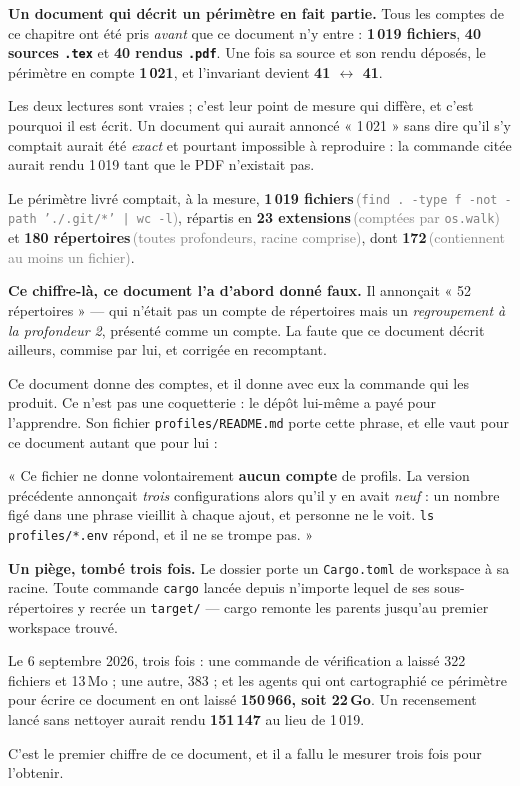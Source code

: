 \documentclass[10pt]{report}
\newcommand{\code}[1]{\texttt{\small #1}}
\newcommand{\att}[1]{\textcolor{amber}{\textbf{#1}}}
\newcommand{\mesure}[2]{\textbf{#1}\,\footnotesize\textcolor{grey}{(#2)}\normalsize}
\begin{document}
\begin{alerte}
\textbf{Un document qui décrit un périmètre en fait partie.} Tous les comptes de ce chapitre ont été
pris \emph{avant} que ce document n'y entre : \textbf{1\,019 fichiers}, \textbf{40 sources
\code{.tex}} et \textbf{40 rendus \code{.pdf}}. Une fois sa source et son rendu déposés, le périmètre
en compte \textbf{1\,021}, et l'invariant devient \textbf{41 $\leftrightarrow$ 41}.

Les deux lectures sont vraies ; c'est leur point de mesure qui diffère, et c'est pourquoi il est
écrit. Un document qui aurait annoncé « 1\,021 » sans dire qu'il s'y comptait aurait été
\emph{exact} et pourtant impossible à reproduire : la commande citée aurait rendu 1\,019 tant que le
PDF n'existait pas.
\end{alerte}

Le périmètre livré comptait, à la mesure, \mesure{1\,019 fichiers}{\code{find . -type f -not -path './.git/*' | wc -l}},
répartis en \mesure{23 extensions}{comptées par \code{os.walk}} et
\mesure{180 répertoires}{toutes profondeurs, racine comprise}, dont
\mesure{172}{contiennent au moins un fichier}.

\att{Ce chiffre-là, ce document l'a d'abord donné faux.} Il annonçait « 52 répertoires » --- qui
n'était pas un compte de répertoires mais un \emph{regroupement à la profondeur 2}, présenté comme
un compte. La faute que ce document décrit ailleurs, commise par lui, et corrigée en recomptant.

Ce document donne des comptes, et il donne avec eux la commande qui les produit. Ce n'est pas une
coquetterie : le dépôt lui-même a payé pour l'apprendre. Son fichier \code{profiles/README.md} porte
cette phrase, et elle vaut pour ce document autant que pour lui :

\begin{these}
« Ce fichier ne donne volontairement \textbf{aucun compte} de profils. La version précédente
annonçait \emph{trois} configurations alors qu'il y en avait \emph{neuf} : un nombre figé dans une
phrase vieillit à chaque ajout, et personne ne le voit. \code{ls profiles/*.env} répond, et il ne se
trompe pas. »
\end{these}

\begin{alerte}
\textbf{Un piège, tombé trois fois.} Le dossier porte un \code{Cargo.toml} de workspace à sa racine.
Toute commande \code{cargo} lancée depuis n'importe lequel de ses sous-répertoires y recrée un
\code{target/} --- cargo remonte les parents jusqu'au premier workspace trouvé.

Le 6 septembre 2026, trois fois : une commande de vérification a laissé 322 fichiers et 13\,Mo ; une
autre, 383 ; et les agents qui ont cartographié ce périmètre pour écrire ce document en ont laissé
\textbf{150\,966, soit 22\,Go}. Un recensement lancé sans nettoyer aurait rendu \textbf{151\,147} au
lieu de 1\,019.

C'est le premier chiffre de ce document, et il a fallu le mesurer trois fois pour l'obtenir.
\end{alerte}
\end{document}
